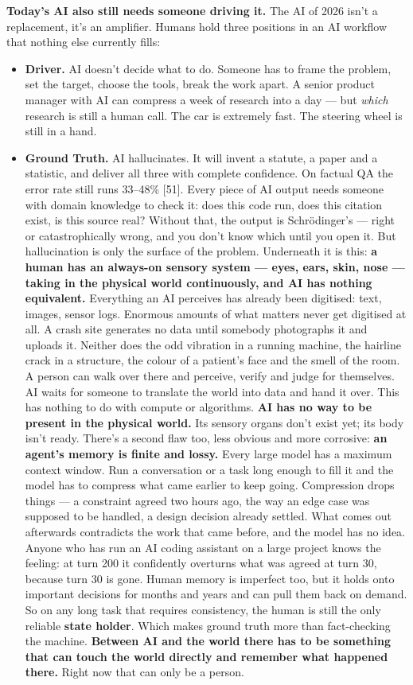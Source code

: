 \documentclass[11pt,a4paper]{article}
\begin{document}
\textbf{Today's AI also still needs someone driving it.} The AI of 2026 isn't a replacement, it's an amplifier. Humans hold three positions in an AI workflow that nothing else currently fills:

\begin{itemize}
  \item \textbf{Driver.} AI doesn't decide what to do. Someone has to frame the problem, set the target, choose the tools, break the work apart. A senior product manager with AI can compress a week of research into a day --- but \textit{which} research is still a human call. The car is extremely fast. The steering wheel is still in a hand.
  \item \textbf{Ground Truth.} AI hallucinates. It will invent a statute, a paper and a statistic, and deliver all three with complete confidence. On factual QA the error rate still runs 33--48\% [51]. Every piece of AI output needs someone with domain knowledge to check it: does this code run, does this citation exist, is this source real? Without that, the output is Schrödinger's --- right or catastrophically wrong, and you don't know which until you open it. But hallucination is only the surface of the problem. Underneath it is this: \textbf{a human has an always-on sensory system --- eyes, ears, skin, nose --- taking in the physical world continuously, and AI has nothing equivalent.} Everything an AI perceives has already been digitised: text, images, sensor logs. Enormous amounts of what matters never get digitised at all. A crash site generates no data until somebody photographs it and uploads it. Neither does the odd vibration in a running machine, the hairline crack in a structure, the colour of a patient's face and the smell of the room. A person can walk over there and perceive, verify and judge for themselves. AI waits for someone to translate the world into data and hand it over. This has nothing to do with compute or algorithms. \textbf{AI has no way to be present in the physical world.} Its sensory organs don't exist yet; its body isn't ready. There's a second flaw too, less obvious and more corrosive: \textbf{an agent's memory is finite and lossy.} Every large model has a maximum context window. Run a conversation or a task long enough to fill it and the model has to compress what came earlier to keep going. Compression drops things --- a constraint agreed two hours ago, the way an edge case was supposed to be handled, a design decision already settled. What comes out afterwards contradicts the work that came before, and the model has no idea. Anyone who has run an AI coding assistant on a large project knows the feeling: at turn 200 it confidently overturns what was agreed at turn 30, because turn 30 is gone. Human memory is imperfect too, but it holds onto important decisions for months and years and can pull them back on demand. So on any long task that requires consistency, the human is still the only reliable \textbf{state holder}. Which makes ground truth more than fact-checking the machine. \textbf{Between AI and the world there has to be something that can touch the world directly and remember what happened there.} Right now that can only be a person.

\end{itemize}
\end{document}
